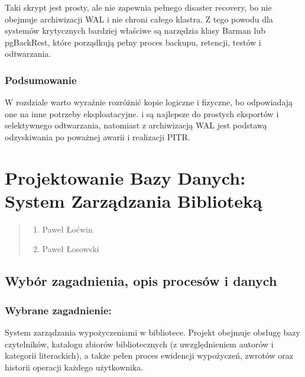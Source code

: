 \documentclass[a4paper,11pt,english,openany,oneside]{sphinxmanual}
\begin{document}
\sphinxAtStartPar
Taki skrypt jest prosty, ale nie zapewnia pełnego disaster recovery, bo nie obejmuje archiwizacji WAL i nie chroni całego klastra. Z tego powodu dla systemów krytycznych bardziej właściwe są narzędzia klasy Barman lub pgBackRest, które porządkują pełny proces backupu, retencji, testów i odtwarzania.


\subsection{Podsumowanie}
\label{\detokenize{rozdzial_2/rozdzial_28/index:podsumowanie}}
\sphinxAtStartPar
W rozdziale warto wyraźnie rozróżnić kopie logiczne i fizyczne, bo odpowiadają one na inne potrzeby eksploatacyjne.  i  są najlepsze do prostych eksportów i selektywnego odtwarzania, natomiast  z archiwizacją WAL jest podstawą odzyskiwania po poważnej awarii i realizacji PITR.

\sphinxstepscope


\chapter{Projektowanie Bazy Danych: System Zarządzania Biblioteką}
\label{\detokenize{rozdzial_3/index:projektowanie-bazy-danych-system-zarzadzania-biblioteka}}\label{\detokenize{rozdzial_3/index::doc}}\begin{quote}\begin{description}
\begin{enumerate}
%
\item {} 
\sphinxAtStartPar
Paweł Łoćwin

\item {} 
\sphinxAtStartPar
Paweł Łosowski

\end{enumerate}

\end{description}\end{quote}


\section{Wybór zagadnienia, opis procesów i danych}
\label{\detokenize{rozdzial_3/index:wybor-zagadnienia-opis-procesow-i-danych}}

\subsection{Wybrane zagadnienie:}
\label{\detokenize{rozdzial_3/index:wybrane-zagadnienie}}
\sphinxAtStartPar
System zarządzania wypożyczeniami w bibliotece.
Projekt obejmuje obsługę bazy czytelników, katalogu zbiorów bibliotecznych (z uwzględnieniem autorów i kategorii literackich), a także pełen proces ewidencji wypożyczeń, zwrotów oraz historii operacji każdego użytkownika.
\end{document}
